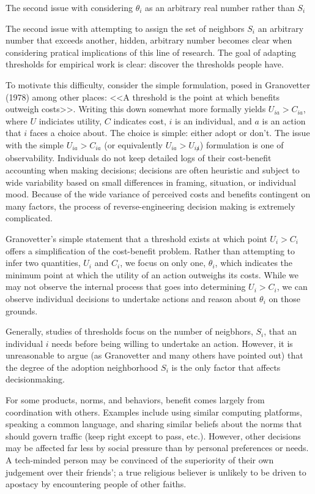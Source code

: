 \documentclass{article}
\begin{document}
The second issue with considering $\theta_i$ as an arbitrary real number rather than $S_i$ 

The second issue with attempting to assign the set of neighbors $S_i$ an arbitrary number that exceeds another, hidden, arbitrary number becomes clear when considering pratical implications of this line of research. The goal of adapting thresholds for empirical work is clear: discover the thresholds people have.







To motivate this difficulty, consider the simple formulation, posed in Granovetter (1978) among other places: <<A threshold is the point at which benefits outweigh costs>>. Writing this down somewhat more formally yields $U_{ia} > C_{ia}$, where $U$ indiciates utility, $C$ indicates cost, $i$ is an individual, and $a$ is an action that $i$ faces a choice about. The choice is simple: either adopt or don't. The issue with the simple $U_{ia} > C_{ia}$ (or equivalently $U_{ia} > U_{i\not a}$) formulation is one of observability. Individuals do not keep detailed logs of their cost-benefit accounting when making decisions; decisions are often heuristic and subject to wide variability based on small differences in framing, situation, or individual mood. Because of the wide variance of perceived costs and benefits contingent on many factors, the process of reverse-engineering decision making is extremely complicated.

Granovetter's simple statement that a threshold exists at which point $U_i > C_i$ offers a simplification of the cost-benefit problem. Rather than attempting to infer two quantities, $U_i$ and $C_i$, we focus on only one, $\theta_i$, which indicates the minimum point at which the utility of an action outweighs its costs. While we may not observe the internal process that goes into determining $U_i > C_i$, we can observe individual decisions to undertake actions and reason about $\theta_i$ on those grounds.

Generally, studies of thresholds focus on the number of neigbhors, $S_i$, that an individual $i$ needs before being willing to undertake an action. However, it is unreasonable to argue (as Granovetter and many others have pointed out) that the degree of the adoption neighborhood $S_i$ is the only factor that affects decisionmaking.

For some products, norms, and behaviors, benefit comes largely from coordination with others. Examples include using similar computing platforms, speaking a common language, and sharing similar beliefs about the norms that should govern traffic (keep right except to pass, etc.). However, other decisions may be affected far less by social pressure than by personal preferences or needs. A tech-minded person may be convinced of the superiority of their own judgement over their friends'; a true religious believer is unlikely to be driven to apostacy by encountering people of other faiths.
\end{document}
